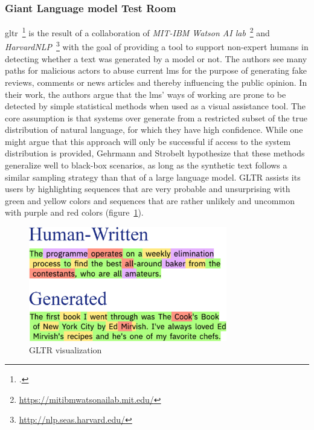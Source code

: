 \subsubsection{Giant Language model Test Room}
\label{sub:gltr}

\gls{gltr}~\footcite{DBLP:journals/corr/abs-1906-04043} is the result of a collaboration of \textit{MIT-IBM Watson AI lab}~\footnote{\url{https://mitibmwatsonailab.mit.edu/}} and \textit{HarvardNLP}~\footnote{\url{http://nlp.seas.harvard.edu/}} with the goal of providing a tool to support non-expert humans in detecting whether a text was generated by a model or not. The authors see many paths for malicious actors to abuse current \gls{lm}s for the purpose of generating fake reviews, comments or news articles and thereby influencing the public opinion. In their work, the authors argue that the \gls{lm}s' ways of working are prone to be detected by simple statistical methods when used as a visual assistance tool. The core assumption is that systems over generate from a restricted subset of the true distribution of natural language, for which they have high confidence. While one might argue that this approach will only be successful if access to the system distribution is provided, Gehrmann and Strobelt hypothesize that these methods generalize well to black-box scenarios, as long as the synthetic text follows a similar sampling strategy than that of a large language model. GLTR assists its users by highlighting sequences that are very probable and unsurprising with green and yellow colors and sequences that are rather unlikely and uncommon with purple and red colors (figure~\ref{fig:gltr}).

\begin{figure}[h]
  	\includegraphics[height=5cm]{img/gltr}
  	\caption{GLTR visualization}
	\label{fig:gltr}
\end{figure}

